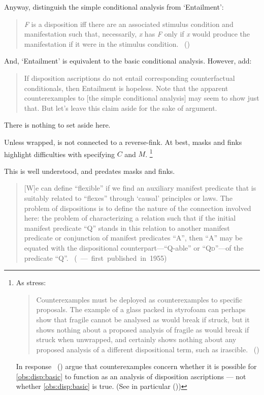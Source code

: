 \begin{note}
{    Anyway, \citeauthor{Choi:2021wg} distinguish the simple conditional analysis from `Entailment':
    \begin{quote}
      \emph{F} is a disposition iff there are an associated stimulus condition and manifestation such that, necessarily, \emph{x} has \emph{F} only if \emph{x} would produce the manifestation if it were in the stimulus condition.%
      \mbox{ }\hfill\mbox{(\citeyear[\S2.1]{Choi:2021wg})}
    \end{quote}
    And, `Entailment' is equivalent to the basic conditional analysis.
    However, \citeauthor{Choi:2021wg} add:
    \begin{quote}
      If disposition ascriptions do not entail corresponding counterfactual conditionals, then Entailment is hopeless.
      Note that the apparent counterexamples to [the simple conditional analysis] may seem to show just that.
      But let's leave this claim aside for the sake of argument.
    \end{quote}
    There is nothing to set aside here.
  }

  Unless wrapped, is not connected to a reverse-fink.
  At best, masks and finks highlight difficulties with specifying \(C\) and \(M\).%
  \footnote{
    As \citeauthor{Bonevac:2011tz} stress:
    \begin{quote}
      Counterexamples must be deployed as counterexamples to specific proposals.
      The example of a glass packed in styrofoam can perhaps show that fragile cannot be analysed as would break if struck, but it shows nothing about a proposed analysis of fragile as would break if struck when unwrapped, and certainly shows nothing about any proposed analysis of a different dispositional term, such as irascible.%
      \mbox{ }\hfill\mbox{(\citeyear[1144]{Bonevac:2011tz})}
    \end{quote}

    \nocite{Manley:2007aa}
    In response~\cite{Manley:2011aa} (\citeyear{Manley:2011aa}) argue that counterexamples concern whether it is possible for \autoref{obs:disp:basic} to function as an analysis of disposition ascriptions --- not whether \autoref{obs:disp:basic} is true.
    (See in particular (\citeyear[\S1.3]{Manley:2011aa}))
  }

  This is well understood, and predates masks and finks.

  \citeauthor{Goodman:1983aa}

  \begin{quote}
    [W]e can define ``flexible'' if we find an auxiliary manifest predicate that is suitably related to ``flexes'' through `causal' principles or laws.
    The problem of dispositions is to define the nature of the connection involved here:
    the problem of characterizing a relation such that if the initial manifest predicate ``Q'' stands in this relation to another manifest predicate or conjunction of manifest predicates ``A'', then ``A'' may be equated with the dispositional counterpart---``Q-able'' or ``Q\textsc{d}''---of the predicate ``Q''.\newline
    \mbox{ }\hfill\mbox{(\citeyear[45]{Goodman:1983aa} --- first published in 1955)}
  \end{quote}


\end{note}

